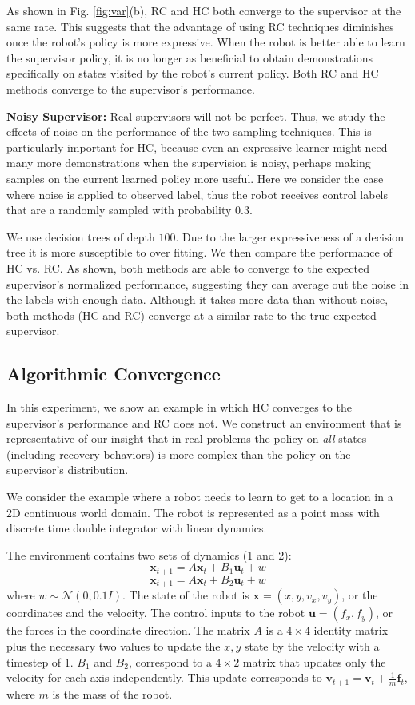 \documentclass[10pt, conference]{ieeeconf}      %
\newcommand{\bu}{\mathbf{u}}
\newcommand{\bx}{\mathbf{x}}
\begin{document}
As shown in Fig. \ref{fig:var}(b), RC and HC both converge to the supervisor at the same rate. This suggests that the advantage of using RC techniques diminishes once the robot's policy is more expressive. When the robot is better able to learn the supervisor policy, it is no longer as beneficial to obtain demonstrations specifically on states visited by the robot's current policy. Both RC and HC methods converge to the supervisor's performance. 


\noindent \textbf{Noisy Supervisor:}
Real supervisors will not be perfect. Thus, we study the effects of noise on the performance of the two sampling techniques. This is particularly important for HC, because even an expressive learner might need many more demonstrations when the supervision is noisy, perhaps making samples on the current learned policy more useful. Here we consider the case where noise is applied to observed label, thus the robot receives control labels that are  a randomly sampled with probability $0.3$.

We use decision trees of depth $100$. Due to the larger expressiveness of a decision tree it is more susceptible to over fitting.  We then compare the performance of HC vs. RC. As shown, both methods are able to converge to the expected supervisor's normalized performance, suggesting they can average out the noise in the labels with enough data. Although it takes more data than without noise, both methods (HC and RC) converge at a similar rate to the true expected supervisor. 

\subsection{Algorithmic Convergence}
In this experiment, we show an example in which HC converges to the supervisor's performance and RC does not. We construct an environment that is representative of our insight that in real problems the policy on \emph{all} states (including recovery behaviors) is more complex than the policy on the supervisor's distribution.

We consider the example where a robot needs to learn to get to a location in a 2D continuous world domain. The robot is represented as a point mass with discrete time double integrator with linear dynamics. 

The environment contains two sets of dynamics (1 and 2): 
$$\bx_{t+1} = A\bx_{t}+B_1\bu_t+w$$
$$\bx_{t+1} = A\bx_{t}+B_2\bu_t + w$$
where $w\sim \mathcal{N}(0,0.1 I)$. The state of the robot is $\bx = (x,y,v_x,v_y)$, or the coordinates and the velocity. The control inputs to the robot $\bu = (f_x,f_y)$, or the forces in the coordinate direction. The matrix $A$ is a $4\times4$ identity matrix plus the necessary two values to update the $x,y$ state by the velocity with a timestep of $1$. $B_1$ and $B_2$, correspond to a $4\times 2$ matrix that updates only the velocity for each axis independently. This update corresponds to $\mathbf{v}_{t+1} = \mathbf{v}_t+\frac{1}{m} \mathbf{f}_t$, where $m$ is the mass of the robot.
\end{document}
